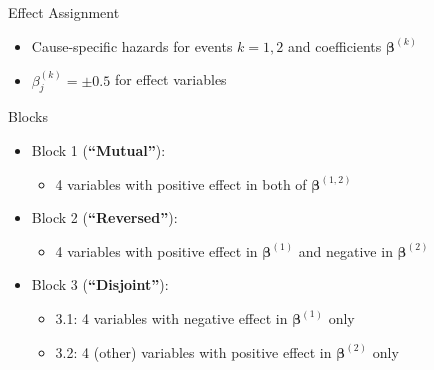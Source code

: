 \documentclass{beamer}
\providecommand{\tightlist}{%
  \setlength{\itemsep}{0pt}\setlength{\parskip}{0pt}}
\begin{document}
\begin{frame}{Effect Assignment}
\protect\hypertarget{effect-assignment}{}
\begin{itemize}
\tightlist
\item
  Cause-specific hazards for events \(k = 1,2\) and coefficients
  \(\pmb{\beta}^{(k)}\)
\item
  \(\beta^{(k)}_j = \pm 0.5\) for effect variables
\end{itemize}

\begin{block}{Blocks}
\protect\hypertarget{blocks-1}{}
\begin{itemize}
\tightlist
\item
  Block 1 (\textbf{``Mutual''}):

  \begin{itemize}
  \tightlist
  \item
    4 variables with positive effect in both of \(\pmb{\beta}^{(1,2)}\)
  \end{itemize}
\item
  Block 2 (\textbf{``Reversed''}):

  \begin{itemize}
  \tightlist
  \item
    4 variables with positive effect in \(\pmb{\beta}^{(1)}\) and
    negative in \(\pmb{\beta}^{(2)}\)
  \end{itemize}
\item
  Block 3 (\textbf{``Disjoint''}):

  \begin{itemize}
  \tightlist
  \item
    3.1: 4 variables with negative effect in \(\pmb{\beta}^{(1)}\) only
  \item
    3.2: 4 (other) variables with positive effect in
    \(\pmb{\beta}^{(2)}\) only
  \end{itemize}
\end{itemize}
\end{block}
\end{frame}
\end{document}
